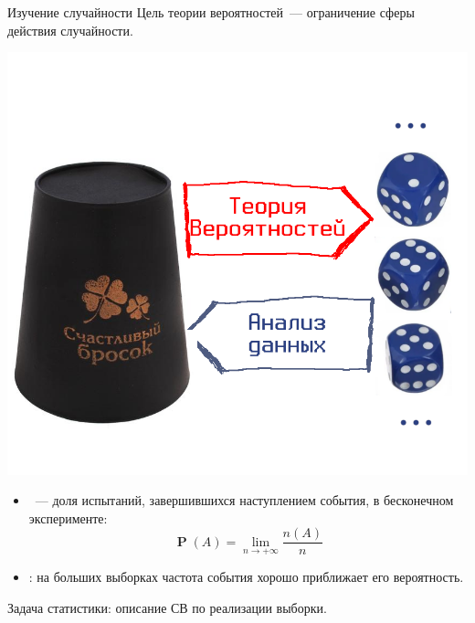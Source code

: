 \documentclass[11pt,pdf,utf8,hyperref={unicode},aspectratio=169]{beamer}
\DeclareMathOperator{\prob}{\mathbf{P}}
\begin{document}
\begin{frame}{Изучение случайности}
    \alert{Цель теории вероятностей}~---  ограничение сферы действия случайности.

    \begin{multicols}{2}
        \begin{center}
            \includegraphics[height=0.7\textheight]{ТВ.png}
        \end{center}
        \columnbreak
        \begin{itemize}
            \item {}~---  доля испытаний, завершившихся наступлением события, в бесконечном эксперименте:
            $$
            \prob(A) =  \lim_{n \to +\infty} \frac{n(A)}{n}
            $$
            \item {}: на больших выборках частота события хорошо приближает его вероятность.
        \end{itemize}
    \end{multicols}
    \alert{Задача статистики:} описание СВ по реализации выборки.


\end{frame}
\end{document}
